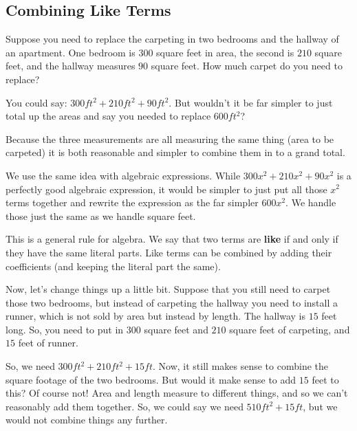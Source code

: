 %
%

\subsection{Combining Like Terms}

Suppose you need to replace the carpeting in two bedrooms and the hallway of an apartment. One bedroom is $300$ square feet in area, the second is $210$ square feet, and the hallway measures $90$ square feet. How much carpet do you need to replace?

You could say: $300 ft^2 + 210 ft^2 +90 ft^2$. But wouldn’t it be far simpler to just total up the areas and say you needed to replace $600 ft^2$?

Because the three measurements are all measuring the same thing (area to be carpeted) it is both reasonable and simpler to combine them in to a grand total.

We use the same idea with algebraic expressions. While $300x^2+210x^2+90x^2$ is a perfectly good algebraic expression, it would be simpler to just put all those $x^2$ terms together and rewrite the expression as the far simpler $600x^2$. We handle those  just the same as we handle square feet.

This is a general rule for algebra. We say that two terms are \textbf{like}  if and only if they have the same literal parts. Like terms can be combined by adding their coefficients (and keeping the literal part the same).



Now, let’s change things up a little bit. Suppose that you still need to carpet those two bedrooms, but instead of carpeting the hallway you need to install a runner, which is not sold by area but instead by length. The hallway is $15$ feet long. So, you need to put in $300$ square feet and $210$ square feet of carpeting, and $15$ feet of runner.

So, we need $300 ft^2+210 ft^2+15ft$. Now, it still makes sense to combine the square footage of the two bedrooms. But would it make sense to add $15$ feet to this? Of course not! Area and length measure to different things, and so we can’t reasonably add them together. So, we could say we need $510 ft^2 + 15 ft$, but we would not combine things any further.

